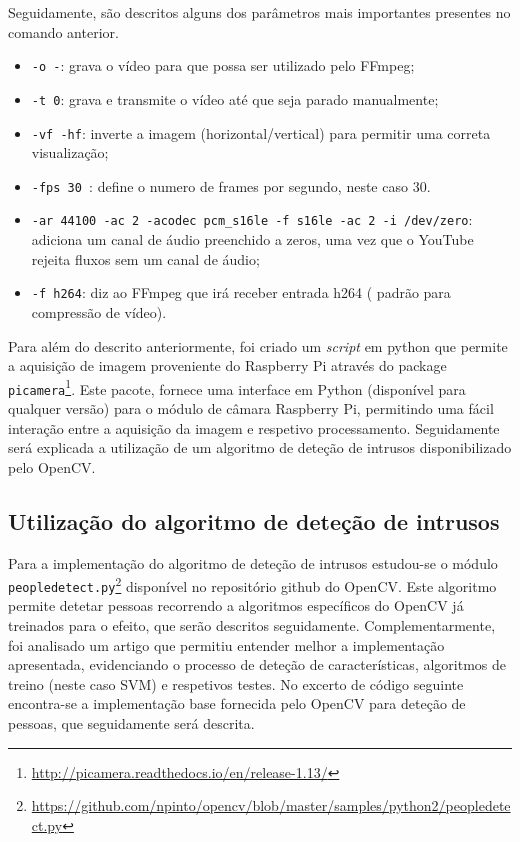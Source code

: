 Seguidamente, são descritos alguns dos parâmetros mais importantes presentes no comando anterior\cite{streamlive}. 

\begin{itemize}
	\item \texttt{-o -}: grava o vídeo para que possa ser utilizado pelo FFmpeg; 
	
	\item \texttt{-t 0}: grava e transmite o vídeo até que seja parado manualmente; 
	
	\item \texttt{-vf -hf}: inverte a imagem (horizontal/vertical) para permitir uma correta visualização; 
	
	\item \texttt{-fps 30 }: define o numero de frames por segundo, neste caso 30. 
	
	\item \texttt{-ar 44100 -ac 2 -acodec pcm\_s16le -f s16le -ac 2 -i /dev/zero}: adiciona um canal de áudio preenchido a zeros, uma vez que o YouTube rejeita fluxos sem um canal de áudio; 
	
	\item \texttt{-f h264}: diz ao FFmpeg que irá receber entrada h264 ( padrão para compressão de vídeo). 
	
\end{itemize}


Para além do descrito anteriormente, foi criado um \textit{script} em python que permite a aquisição de imagem proveniente do Raspberry Pi através do package \texttt{picamera}\footnote{\url{http://picamera.readthedocs.io/en/release-1.13/}}. Este pacote, fornece  uma interface em Python (disponível para qualquer versão) para o módulo de câmara Raspberry Pi, permitindo uma fácil interação entre a aquisição da imagem e respetivo processamento.
Seguidamente será explicada a utilização de um algoritmo de deteção de intrusos disponibilizado pelo OpenCV. 


\subsection{Utilização do algoritmo de deteção de intrusos}
\label{algdetecao}

Para a implementação do algoritmo de deteção de intrusos estudou-se o módulo \linebreak \texttt{peopledetect.py}\footnote{\url{https://github.com/npinto/opencv/blob/master/samples/python2/peopledetect.py}} disponível no repositório github do OpenCV. Este algoritmo permite detetar pessoas recorrendo a algoritmos específicos do OpenCV já treinados para o efeito, que serão descritos seguidamente. Complementarmente, foi analisado um artigo\cite{Dalal} que permitiu entender melhor a implementação apresentada, evidenciando o processo de deteção de características, algoritmos de treino (neste caso \ac{SVM}) e respetivos testes. No excerto de código seguinte encontra-se a implementação base fornecida pelo OpenCV para deteção de pessoas, que seguidamente será descrita. 

